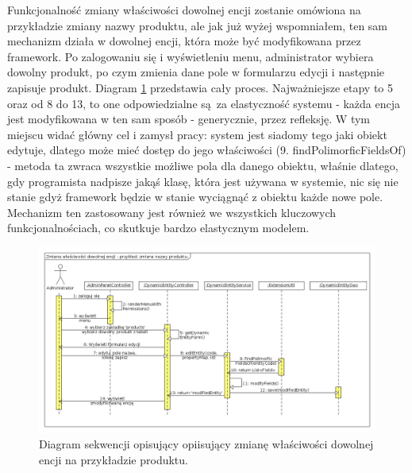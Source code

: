 Funkcjonalność zmiany właściwości dowolnej encji zostanie omówiona na przykładzie zmiany nazwy produktu, ale jak już wyżej wspomniałem, ten sam mechanizm działa w dowolnej encji, która może być modyfikowana przez framework. Po zalogowaniu się i wyświetleniu menu, administrator wybiera dowolny produkt, po czym zmienia dane pole w formularzu edycji i następnie zapisuje produkt. Diagram \ref{zmianaWlEncji} przedstawia cały proces. Najważniejsze etapy to 5 oraz od 8 do 13, to one odpowiedzialne są za elastyczność systemu - każda encja jest modyfikowana w ten sam sposób - generycznie, przez refleksję. W tym miejscu widać główny cel i zamysł pracy: system jest siadomy tego jaki obiekt edytuje, dlatego może mieć dostęp do jego właściwości (9. findPolimorficFieldsOf) - metoda ta zwraca wszystkie możliwe pola dla danego obiektu, właśnie dlatego, gdy programista nadpisze jakąś klasę, która jest używana w systemie, nic się nie stanie gdyż framework będzie w stanie wyciągnąć z obiektu każde nowe pole. Mechanizm ten zastosowany jest również we wszystkich kluczowych funkcjonalnościach, co skutkuje bardzo elastycznym modelem.
\begin{figure}
	\begin{center}
		\includegraphics[scale=0.4]{zmianaWlEncji.png}
	\end{center}
	\caption{{\color{black}Diagram sekwencji opisujący opiisujący zmianę właściwości dowolnej encji na przykładzie produktu.}} \label{zmianaWlEncji}
\end{figure}

